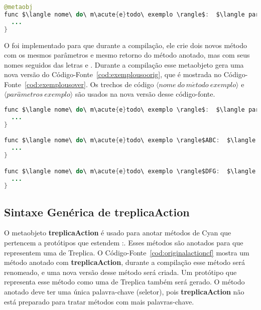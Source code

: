 \begin{lstlisting}[language=Java, caption={Exemplo de código-fonte original}, label={cod:exemplousoorig}, mathescape=true]
@metaobj
func $\langle nome\ do\ m\acute{e}todo\ exemplo \rangle$:  $\langle par\hat{a}metros\ exemplo \rangle$ {
  ...
}
\end{lstlisting}

O  foi implementado para que durante a compilação, ele crie dois novos método com os mesmos parâmetros e mesmo retorno do método anotado, mas com seus nomes seguidos das letras  e . Durante a compilação esse metaobjeto gera uma nova versão do Código-Fonte~\ref{cod:exemplousoorig}, que é mostrada no Código-Fonte~\ref{cod:exemplousover}. Os trechos de código $\langle nome\ do\ m\acute{e}todo\ exemplo \rangle$ e $\langle par\hat{a}metros\ exemplo \rangle$ são usados na nova versão desse código-fonte.

\begin{lstlisting}[language=Java, caption={Exemplo do código-fonte gerado por \textbf{metaobj}}, label={cod:exemplousover}, mathescape=true]
func $\langle nome\ do\ m\acute{e}todo\ exemplo \rangle$:  $\langle par\hat{a}metros\ exemplo \rangle$ {
  ...
}

func $\langle nome\ do\ m\acute{e}todo\ exemplo \rangle$ABC:  $\langle par\hat{a}metros\ exemplo \rangle$ {
  ...
}

func $\langle nome\ do\ m\acute{e}todo\ exemplo \rangle$DFG:  $\langle par\hat{a}metros\ exemplo \rangle$ {
  ...
}
\end{lstlisting}

\subsection{Sintaxe Genérica de \textbf{treplicaAction}}

O metaobjeto \textbf{treplicaAction} é usado para anotar métodos de Cyan que pertencem a protótipos que estendem :. Esses métodos são anotados para que representem uma  de Treplica. O Código-Fonte~\ref{cod:originalactioncf} mostra um método anotado com \textbf{treplicaAction}, durante a compilação esse método será renomeado, e uma nova versão desse método será criada. Um protótipo que representa esse método como uma  de Treplica também será gerado. O método anotado deve ter uma única palavra-chave (seletor), pois \textbf{treplicaAction} não está preparado para tratar métodos com mais palavras-chave.


